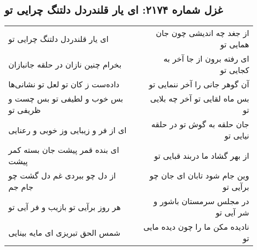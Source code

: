 \begin{center}
\section*{غزل شماره ۲۱۷۴: ای یار قلندردل دلتنگ چرایی تو}
\label{sec:2174}
\begin{longtable}{l p{0.5cm} r}
ای یار قلندردل دلتنگ چرایی تو
&&
از جغد چه اندیشی چون جان همایی تو
\\
بخرام چنین نازان در حلقه جانبازان
&&
ای رفته برون از جا آخر به کجایی تو
\\
داده‌ست ز کان تو لعل تو نشانی‌ها
&&
آن گوهر جانی را آخر ننمایی تو
\\
بس خوب و لطیفی تو بس چست و ظریفی تو
&&
بس ماه لقایی تو آخر چه بلایی تو
\\
ای از فر و زیبایی وز خوبی و رعنایی
&&
جان حلقه به گوش تو در حلقه نیایی تو
\\
ای بنده قمر پیشت جان بسته کمر پیشت
&&
از بهر گشاد ما دربند قبایی تو
\\
از دل چو ببردی غم دل گشت چو جام جم
&&
وین جام شود تابان ای جان چو برآیی تو
\\
هر روز برآیی تو بازیب و فر آیی تو
&&
در مجلس سرمستان باشور و شر آیی تو
\\
شمس الحق تبریزی ای مایه بینایی
&&
نادیده مکن ما را چون دیده مایی تو
\\
\end{longtable}
\end{center}
